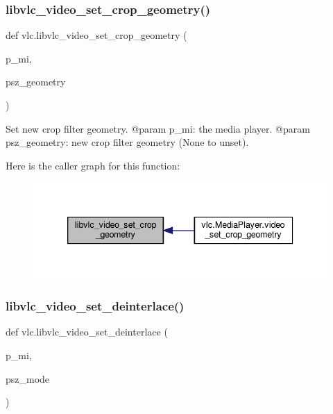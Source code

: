 \subsubsection{\texorpdfstring{libvlc\+\_\+video\+\_\+set\+\_\+crop\+\_\+geometry()}{libvlc\_video\_set\_crop\_geometry()}}
{\footnotesize\ttfamily def vlc.\+libvlc\+\_\+video\+\_\+set\+\_\+crop\+\_\+geometry (\begin{DoxyParamCaption}\item[{}]{p\+\_\+mi,  }\item[{}]{psz\+\_\+geometry }\end{DoxyParamCaption})}

\begin{DoxyVerb}Set new crop filter geometry.
@param p_mi: the media player.
@param psz_geometry: new crop filter geometry (None to unset).
\end{DoxyVerb}
 Here is the caller graph for this function\+:
\nopagebreak
\begin{figure}[H]
\begin{center}
\leavevmode
\includegraphics[width=339pt]{namespacevlc_abdfc647c45f0b22d8aa3ad8f87b9bd12_icgraph}
\end{center}
\end{figure}
\mbox{\label{namespacevlc_a32c28e8b47f625bc8dc4a3634548fe65}} 
\subsubsection{\texorpdfstring{libvlc\+\_\+video\+\_\+set\+\_\+deinterlace()}{libvlc\_video\_set\_deinterlace()}}
{\footnotesize\ttfamily def vlc.\+libvlc\+\_\+video\+\_\+set\+\_\+deinterlace (\begin{DoxyParamCaption}\item[{}]{p\+\_\+mi,  }\item[{}]{psz\+\_\+mode }\end{DoxyParamCaption})}

